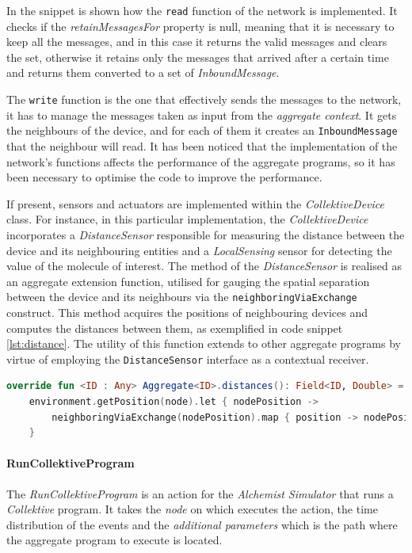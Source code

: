 In the  snippet is shown how the \texttt{read} function of the network is implemented.
It checks if the \emph{retainMessagesFor} property is null, meaning that it is necessary to keep all the messages,
and in this case it returns the valid messages and clears the set, otherwise it retains only the messages that arrived
after a certain time and returns them converted to a set of \emph{InboundMessage}.

The \texttt{write} function is the one that effectively sends the messages to the network, it has to manage the messages
taken as input from the \emph{aggregate context}.
It gets the neighbours of the device, and for each of them it creates an \texttt{InboundMessage} that the neighbour will read.
It has been noticed that the implementation of the network's functions affects the performance of the aggregate programs,
so it has been necessary to optimise the code to improve the performance.

If present, sensors and actuators are implemented within the \emph{CollektiveDevice} class.
For instance, in this particular implementation, the \emph{CollektiveDevice} incorporates a \emph{DistanceSensor} responsible for
measuring the distance between the device and its neighbouring entities and a \emph{LocalSensing} sensor for detecting the
value of the molecule of interest.
The method of the \emph{DistanceSensor} is realised as an aggregate extension function, utilised for gauging the spatial
separation between the device and its neighbours via the \texttt{neighboringViaExchange} construct.
This method acquires the positions of neighbouring devices and computes the distances between them, as exemplified in code snippet \ref{lst:distance}.
The utility of this function extends to other aggregate programs by virtue of employing the \texttt{DistanceSensor} interface as a contextual receiver.

\begin{lstlisting}[language=kt,label={lst:distance},caption={The implementation of the \texttt{distance} function.}]
override fun <ID : Any> Aggregate<ID>.distances(): Field<ID, Double> =
    environment.getPosition(node).let { nodePosition ->
        neighboringViaExchange(nodePosition).map { position -> nodePosition.distanceTo(position) }
    }
\end{lstlisting}

\paragraph{RunCollektiveProgram}
\label{par:run-collektive-program}
The \emph{RunCollektiveProgram} is an action for the \emph{Alchemist Simulator} that runs a \emph{Collektive} program.
It takes the \emph{node} on which executes the action, the time distribution of the events and the \emph{additional parameters}
which is the path where the aggregate program to execute is located.

